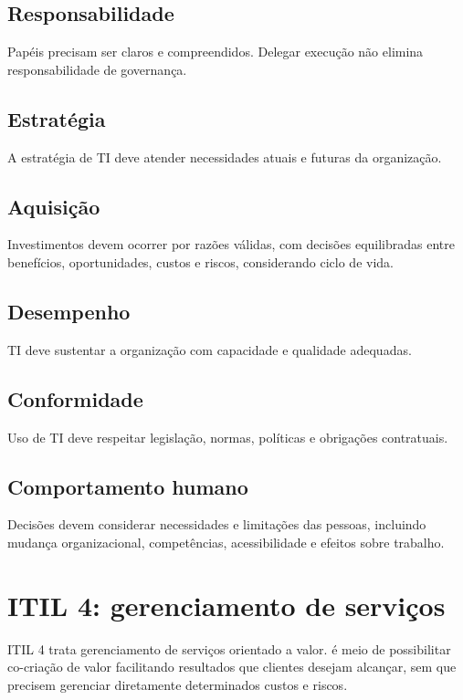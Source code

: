 \subsection{Responsabilidade}

Papéis precisam ser claros e compreendidos. Delegar execução não elimina responsabilidade de governança.

\subsection{Estratégia}

A estratégia de TI deve atender necessidades atuais e futuras da organização.

\subsection{Aquisição}

Investimentos devem ocorrer por razões válidas, com decisões equilibradas entre benefícios, oportunidades, custos e riscos, considerando ciclo de vida.

\subsection{Desempenho}

TI deve sustentar a organização com capacidade e qualidade adequadas.

\subsection{Conformidade}

Uso de TI deve respeitar legislação, normas, políticas e obrigações contratuais.

\subsection{Comportamento humano}

Decisões devem considerar necessidades e limitações das pessoas, incluindo mudança organizacional, competências, acessibilidade e efeitos sobre trabalho.

\section{ITIL 4: gerenciamento de serviços}

ITIL 4 trata gerenciamento de serviços orientado a valor.  é meio de possibilitar co-criação de valor facilitando resultados que clientes desejam alcançar, sem que precisem gerenciar diretamente determinados custos e riscos.

